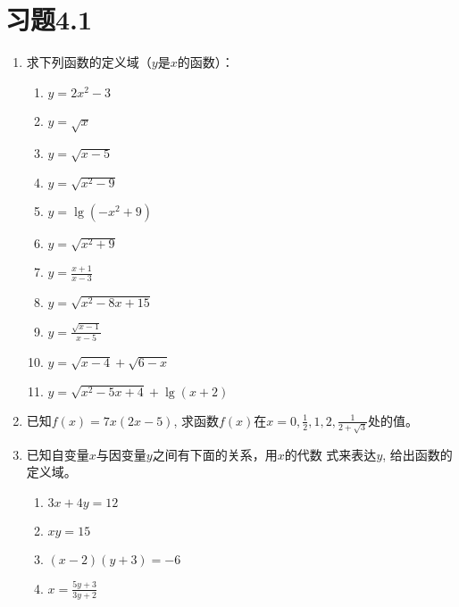 \section*{习题4.1}
\begin{enumerate}
    \item     求下列函数的定义域（$y$是$x$的函数）：
    \begin{multicols}{2}
\begin{enumerate}
    \item $y=2x^2-3$
    \item $y=\sqrt{x}$
    \item $y=\sqrt{x-5}$
    \item $y=\sqrt{x^2-9}$
    \item $y=\lg(-x^2+9)$
    \item $y=\sqrt{x^2+9}$
    \item $y=\frac{x+1}{x-3}$
    \item $y=\sqrt{x^2-8x+15}$
    \item $y=\frac{\sqrt{x-1}}{x-5}$
    \item $y=\sqrt{x-4}+\sqrt{6-x}$
    \item $y=\sqrt{x^2-5x+4}+\lg(x+2)$

\end{enumerate}        
    \end{multicols}

\item 已知$f(x)=7x(2x-5)$, 求函数$f(x)$在$x=0,\frac{1}{2},1,2,
    \frac{1}{2+\sqrt{3}}$处的值。
    
\item 已知自变量$x$与因变量$y$之间有下面的关系，用$x$的代数
    式来表达$y$, 给出函数的定义域。
\begin{multicols}{2}
\begin{enumerate}
    \item $3x+4y=12$
    \item $xy=15$
    \item $(x-2)(y+3)=-6$
    \item $x=\frac{5y+3}{3y+2}$
\end{enumerate}
\end{multicols}


\end{enumerate}
